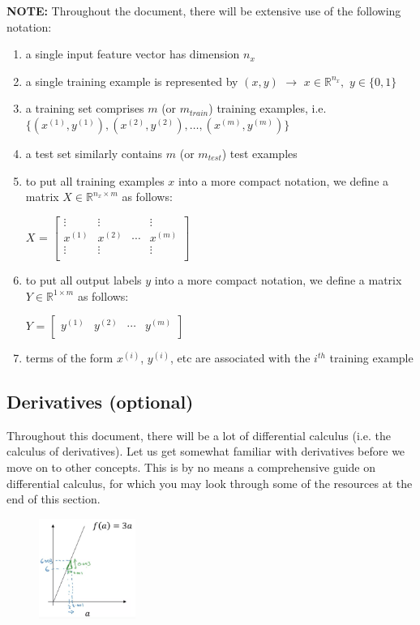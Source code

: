 \documentclass{article}[a4paper,12pt]
\theoremstyle{definition}
\begin{document}
\textbf{NOTE:} Throughout the document, there will be extensive use of the following notation:
\begin{enumerate}
	\item a single input feature vector has dimension $n_x$
	\item a single training example is represented by $(x,y)$ $\rightarrow$ $x\in\mathbb{R}^{n_x},$ $y\in\{0,1\}$
	\item a training set comprises $m$ (or $m_{train}$) training examples, i.e. $\{(x^{(1)},y^{(1)}), (x^{(2)},y^{(2)}), \dots, (x^{(m)},y^{(m)})\}$
	\item a test set similarly contains $m$ (or $m_{test}$) test examples
	\item to put all training examples $x$ into a more compact notation, we define a matrix $X\in\mathbb{R}^{n_x\times m}$ as follows:
\begin{center}
$X$ = 
$\begin{bmatrix}
	\vdots & \vdots & & \vdots\\
	x^{(1)} & x^{(2)} & \cdots & x^{(m)}\\
	\vdots & \vdots & & \vdots\\
\end{bmatrix}$
\end{center}
	\item to put all output labels $y$ into a more compact notation, we define a matrix $Y\in\mathbb{R}^{1\times m}$ as follows:
\begin{center}
$Y$ = 
$\begin{bmatrix}
	y^{(1)} & y^{(2)} & \cdots & y^{(m)}\\
\end{bmatrix}$
\end{center}
	\item terms of the form $x^{(i)}$, $y^{(i)}$, etc are associated with the $i^{th}$ training example
\end{enumerate}
\subsection{Derivatives (optional)}
Throughout this document, there will be a lot of differential calculus (i.e. the calculus of derivatives). Let us get somewhat familiar with derivatives before we move on to other concepts. This is by no means a comprehensive guide on differential calculus, for which you may look through some of the resources at the end of this section.

\begin{figure}
\centering \includegraphics[width=0.28\textwidth]{y_equals_3x.png}
\end{figure}
\vspace{6pt}
\end{document}
